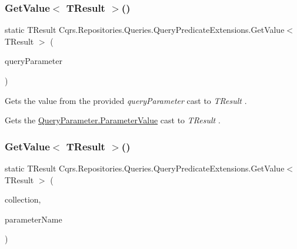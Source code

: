 \subsubsection{\texorpdfstring{Get\+Value$<$ T\+Result $>$()}{GetValue< TResult >()}\hspace{0.1cm}{\footnotesize\ttfamily [4/7]}}
{\footnotesize\ttfamily static T\+Result Cqrs.\+Repositories.\+Queries.\+Query\+Predicate\+Extensions.\+Get\+Value$<$ T\+Result $>$ (\begin{DoxyParamCaption}\item[{this \hyperlink{classCqrs_1_1Repositories_1_1Queries_1_1QueryParameter}{Query\+Parameter}}]{query\+Parameter }\end{DoxyParamCaption})\hspace{0.3cm}{\ttfamily [static]}}



Gets the value from the provided {\itshape query\+Parameter}  cast to {\itshape T\+Result} . 

Gets the \hyperlink{classCqrs_1_1Repositories_1_1Queries_1_1QueryParameter_a0d1c69ffc864aeda2eb515a9e57fbd7a_a0d1c69ffc864aeda2eb515a9e57fbd7a}{Query\+Parameter.\+Parameter\+Value} cast to {\itshape T\+Result} . \mbox{\label{classCqrs_1_1Repositories_1_1Queries_1_1QueryPredicateExtensions_a64fd0cc36edc56c037cd876034d92ebc_a64fd0cc36edc56c037cd876034d92ebc}} 
\subsubsection{\texorpdfstring{Get\+Value$<$ T\+Result $>$()}{GetValue< TResult >()}\hspace{0.1cm}{\footnotesize\ttfamily [5/7]}}
{\footnotesize\ttfamily static T\+Result Cqrs.\+Repositories.\+Queries.\+Query\+Predicate\+Extensions.\+Get\+Value$<$ T\+Result $>$ (\begin{DoxyParamCaption}\item[{this I\+Set$<$ \hyperlink{classCqrs_1_1Repositories_1_1Queries_1_1QueryParameter}{Query\+Parameter} $>$}]{collection,  }\item[{string}]{parameter\+Name }\end{DoxyParamCaption})\hspace{0.3cm}{\ttfamily [static]}}



